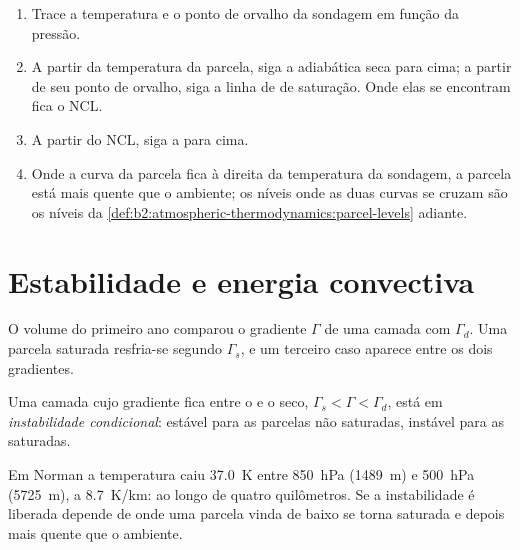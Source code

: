 \begin{method}\label{met:b2:atmospheric-thermodynamics:lift}
\begin{enumerate}
  \item Trace a temperatura e o ponto de orvalho da sondagem em função da pressão.
  \item A partir da temperatura da parcela, siga a adiabática seca para cima; a partir de seu ponto de orvalho, siga
        a linha de  de saturação. Onde elas se encontram fica o NCL.
  \item A partir do NCL, siga a  para cima.
  \item Onde a curva da parcela fica à direita da temperatura da sondagem, a parcela está
        mais quente que o ambiente; os níveis onde as duas curvas se cruzam são os níveis da
        \cref{def:b2:atmospheric-thermodynamics:parcel-levels} adiante.
\end{enumerate}
\end{method}


\section{Estabilidade e energia convectiva}\label{sec:b2:atmospheric-thermodynamics:stability}

O volume do primeiro ano comparou o gradiente $\Gamma$ de uma camada com $\Gamma_d$. Uma parcela saturada
resfria-se segundo $\Gamma_s$, e um terceiro caso aparece entre os dois gradientes.

\begin{definition}\label{def:b2:atmospheric-thermodynamics:instability}
Uma camada cujo gradiente fica entre o  e o seco,
$\Gamma_s < \Gamma < \Gamma_d$, está em \emph{instabilidade condicional}:
estável para as parcelas não saturadas, instável para as saturadas.
\end{definition}

Em Norman a temperatura caiu \qty{37.0}{K} entre \qty{850}{hPa} (\qty{1489}{m}) e
\qty{500}{hPa} (\qty{5725}{m}), a \qty{8.7}{K/km}:  ao longo de quatro quilômetros.
Se a instabilidade é liberada depende de onde uma parcela vinda de baixo se torna saturada e
depois mais quente que o ambiente.

